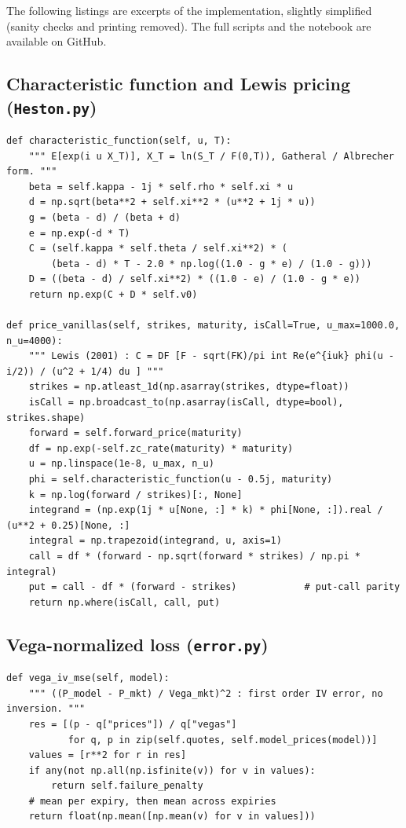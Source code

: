 \documentclass[11pt,a4paper]{article}
\theoremstyle{plain}
\theoremstyle{definition}
\begin{document}
The following listings are excerpts of the implementation, slightly simplified (sanity checks and printing removed). The full scripts and the notebook are available on GitHub.

\subsection{Characteristic function and Lewis pricing (\texttt{Heston.py})}
\begin{lstlisting}[style=pystyle]
def characteristic_function(self, u, T):
    """ E[exp(i u X_T)], X_T = ln(S_T / F(0,T)), Gatheral / Albrecher form. """
    beta = self.kappa - 1j * self.rho * self.xi * u
    d = np.sqrt(beta**2 + self.xi**2 * (u**2 + 1j * u))
    g = (beta - d) / (beta + d)
    e = np.exp(-d * T)
    C = (self.kappa * self.theta / self.xi**2) * (
        (beta - d) * T - 2.0 * np.log((1.0 - g * e) / (1.0 - g)))
    D = ((beta - d) / self.xi**2) * ((1.0 - e) / (1.0 - g * e))
    return np.exp(C + D * self.v0)

def price_vanillas(self, strikes, maturity, isCall=True, u_max=1000.0, n_u=4000):
    """ Lewis (2001) : C = DF [F - sqrt(FK)/pi int Re(e^{iuk} phi(u - i/2)) / (u^2 + 1/4) du ] """
    strikes = np.atleast_1d(np.asarray(strikes, dtype=float))
    isCall = np.broadcast_to(np.asarray(isCall, dtype=bool), strikes.shape)
    forward = self.forward_price(maturity)
    df = np.exp(-self.zc_rate(maturity) * maturity)
    u = np.linspace(1e-8, u_max, n_u)
    phi = self.characteristic_function(u - 0.5j, maturity)
    k = np.log(forward / strikes)[:, None]
    integrand = (np.exp(1j * u[None, :] * k) * phi[None, :]).real / (u**2 + 0.25)[None, :]
    integral = np.trapezoid(integrand, u, axis=1)
    call = df * (forward - np.sqrt(forward * strikes) / np.pi * integral)
    put = call - df * (forward - strikes)            # put-call parity
    return np.where(isCall, call, put)
\end{lstlisting}

\subsection{Vega-normalized loss (\texttt{error.py})}
\begin{lstlisting}[style=pystyle]
def vega_iv_mse(self, model):
    """ ((P_model - P_mkt) / Vega_mkt)^2 : first order IV error, no inversion. """
    res = [(p - q["prices"]) / q["vegas"]
           for q, p in zip(self.quotes, self.model_prices(model))]
    values = [r**2 for r in res]
    if any(not np.all(np.isfinite(v)) for v in values):
        return self.failure_penalty
    # mean per expiry, then mean across expiries
    return float(np.mean([np.mean(v) for v in values]))
\end{lstlisting}
\end{document}
